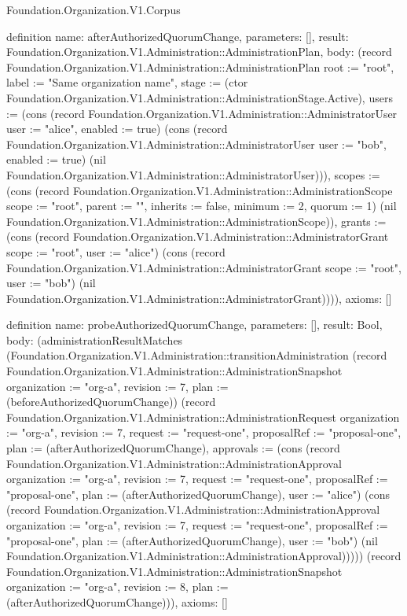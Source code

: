 \begin{lexlean}{Foundation.Organization.V1.Corpus}
\begin{semanticmodule}
definition{
  name: afterAuthorizedQuorumChange,
  parameters: [],
  result: Foundation.Organization.V1.Administration::AdministrationPlan,
  body: (record Foundation.Organization.V1.Administration::AdministrationPlan {root := "root", label := "Same organization name", stage := (ctor Foundation.Organization.V1.Administration::AdministrationStage.Active), users := (cons (record Foundation.Organization.V1.Administration::AdministratorUser {user := "alice", enabled := true}) (cons (record Foundation.Organization.V1.Administration::AdministratorUser {user := "bob", enabled := true}) (nil Foundation.Organization.V1.Administration::AdministratorUser))), scopes := (cons (record Foundation.Organization.V1.Administration::AdministrationScope {scope := "root", parent := "", inherits := false, minimum := 2, quorum := 1}) (nil Foundation.Organization.V1.Administration::AdministrationScope)), grants := (cons (record Foundation.Organization.V1.Administration::AdministratorGrant {scope := "root", user := "alice"}) (cons (record Foundation.Organization.V1.Administration::AdministratorGrant {scope := "root", user := "bob"}) (nil Foundation.Organization.V1.Administration::AdministratorGrant)))}),
  axioms: []
}

definition{
  name: probeAuthorizedQuorumChange,
  parameters: [],
  result: Bool,
  body: (administrationResultMatches (Foundation.Organization.V1.Administration::transitionAdministration (record Foundation.Organization.V1.Administration::AdministrationSnapshot {organization := "org-a", revision := 7, plan := (beforeAuthorizedQuorumChange)}) (record Foundation.Organization.V1.Administration::AdministrationRequest {organization := "org-a", revision := 7, request := "request-one", proposalRef := "proposal-one", plan := (afterAuthorizedQuorumChange), approvals := (cons (record Foundation.Organization.V1.Administration::AdministrationApproval {organization := "org-a", revision := 7, request := "request-one", proposalRef := "proposal-one", plan := (afterAuthorizedQuorumChange), user := "alice"}) (cons (record Foundation.Organization.V1.Administration::AdministrationApproval {organization := "org-a", revision := 7, request := "request-one", proposalRef := "proposal-one", plan := (afterAuthorizedQuorumChange), user := "bob"}) (nil Foundation.Organization.V1.Administration::AdministrationApproval)))})) (record Foundation.Organization.V1.Administration::AdministrationSnapshot {organization := "org-a", revision := 8, plan := (afterAuthorizedQuorumChange)})),
  axioms: []
}


\end{semanticmodule}
\end{lexlean}
